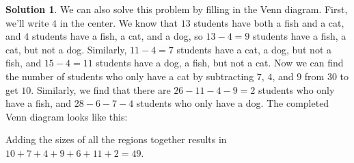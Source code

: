 \documentclass{article}
\theoremstyle{definition}
\newtheorem*{solution}{Solution}
\begin{document}
\begin{enumerate}
\begin{solution}
            We can also solve this problem by filling in the Venn diagram.  
            First, we'll write $4$ in the center. We know that $13$ students 
            have both a fish and a cat, and $4$ students have a fish, a cat, and 
            a dog, so $13 - 4 = 9$ students have a fish, a cat, but not a dog.  
            Similarly, $11 - 4 = 7$ students have a cat, a dog, but not a fish, 
            and $15 - 4 = 11$ students have a dog, a fish, but not a cat. Now we 
            can find the number of students who only have a cat by subtracting 
            $7$, $4$, and $9$ from $30$ to get $10$. Similarly, we find that 
            there are $26 - 11 - 4 - 9 = 2$ students who only have a fish, and 
            $28 - 6 - 7 - 4$ students who only have a dog. The completed Venn 
            diagram looks like this:

            \begin{center}
            \end{center}
            
            Adding the sizes of all the regions together results in $10 + 7 + 4 
            + 9 + 6 + 11 + 2 = 49$.
        \end{solution}
\end{enumerate}
\end{document}
